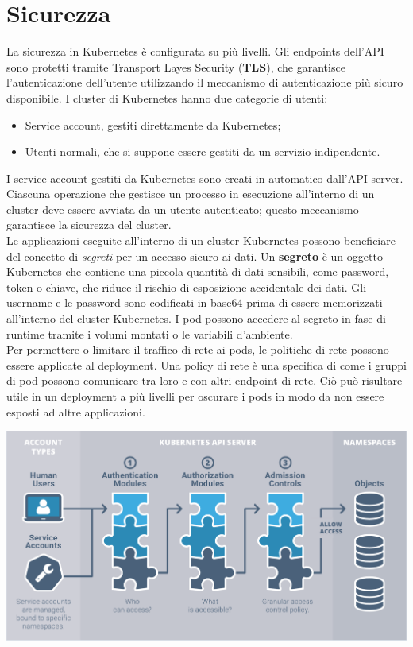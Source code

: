 \documentclass[12pt, a4paper]{report}
\begin{document}
\section{Sicurezza}
La sicurezza in Kubernetes è configurata su più livelli. Gli endpoints dell'API sono protetti tramite Transport Layes Security (\textbf{TLS}), che garantisce l'autenticazione dell'utente utilizzando il meccanismo di autenticazione più sicuro disponibile. I cluster di Kubernetes hanno due categorie di utenti:
\begin{itemize}
  \item Service account, gestiti direttamente da Kubernetes;
  \item Utenti normali, che si suppone essere gestiti da un servizio indipendente.
\end{itemize}
I service account gestiti da Kubernetes sono creati in automatico dall'API server. Ciascuna operazione che gestisce un processo in esecuzione all'interno di un cluster deve essere avviata da un utente autenticato; questo meccanismo garantisce la sicurezza del cluster.\\
Le applicazioni eseguite all'interno di un cluster Kubernetes possono beneficiare del concetto di \textit{segreti} per un accesso sicuro ai dati. Un \textbf{segreto} è un oggetto Kubernetes che contiene una piccola quantità di dati sensibili, come password, token o chiave, che riduce il rischio di esposizione accidentale dei dati. Gli username e le password sono codificati in base64 prima di essere memorizzati all'interno del cluster Kubernetes. I pod possono accedere al segreto in fase di runtime tramite i volumi montati o le variabili d'ambiente.\\
Per permettere o limitare il traffico di rete ai pods, le politiche di rete possono essere applicate al deployment. Una policy di rete è una specifica di come i gruppi di pod possono comunicare tra loro e con altri endpoint di rete. Ciò può risultare utile in un deployment a più livelli per oscurare i pods in modo da non essere esposti ad altre applicazioni.
\begin{center}
  \includegraphics[scale = 0.5]{Images/Kubernetes-auth}\\
\end{center}
\end{document}
